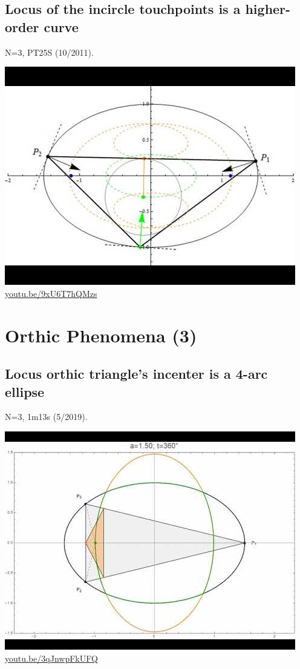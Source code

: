 \documentclass[12pt]{amsart}
\begin{document}
\subsection{Locus of the incircle touchpoints is a higher-order curve}
\label{vid:9xU6T7hQMzs}
\noindent N=3, PT25S (10/2011). 
\begin{center}\includegraphics[width=.5\textwidth]{pics/9xU6T7hQMzs.jpg} \\ 
\href{https://youtu.be/9xU6T7hQMzs}{\url{youtu.be/9xU6T7hQMzs}}\end{center}
% 

\section{Orthic Phenomena (3)}

\subsection{Locus orthic triangle's incenter is a 4-arc ellipse}
\label{vid:3qJnwpFkUFQ}
\noindent N=3, 1m13s (5/2019). 
\begin{center}\includegraphics[width=.5\textwidth]{pics/3qJnwpFkUFQ.jpg} \\ 
\href{https://youtu.be/3qJnwpFkUFQ}{\url{youtu.be/3qJnwpFkUFQ}}\end{center}
% 
\end{document}
